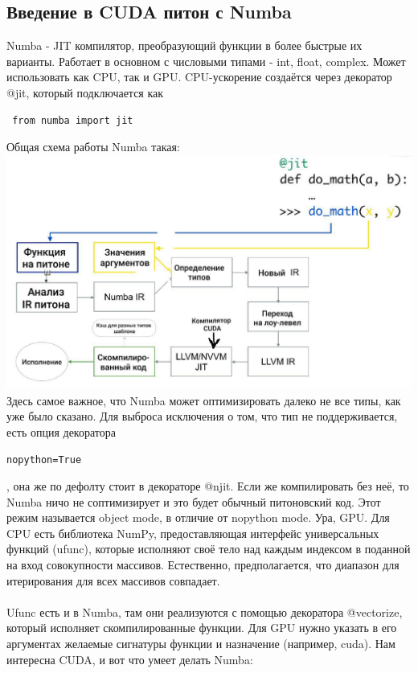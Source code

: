 \documentclass[14pt]{extarticle}
\begin{document}
\subsection{Введение в CUDA питон с Numba}
Numba - JIT компилятор, преобразующий функции в более быстрые 
их варианты. Работает в основном с числовыми типами - int, float,
complex. Может использовать как CPU, так и GPU.
CPU-ускорение создаётся через декоратор @jit, который 
подключается как \begin{verbatim} from numba import jit \end{verbatim} 
Общая схема работы Numba такая:\\
\includegraphics[scale=0.4]{numba.jpeg}
Здесь самое важное, что Numba может оптимизировать
далеко не все типы, как уже было сказано. Для выброса 
исключения о том, что тип не поддерживается, есть 
опция декоратора \begin{verbatim}nopython=True\end{verbatim},
она же по дефолту стоит в декораторе @njit. Если же
компилировать без неё, то Numba ничо не соптимизирует 
и это будет обычный питоновский код. Этот режим 
называется object mode, в отличие от nopython mode.
\newpage
Ура, GPU. Для CPU есть библиотека NumPy, 
предоставляющая интерфейс универсальных функций (ufunc), 
которые исполняют своё тело над каждым индексом в 
поданной на вход совокупности массивов. Естественно,
предполагается, что диапазон для 
итерирования для всех массивов совпадает.\\\\
Ufunc есть и в Numba, там они реализуются с помощью 
декоратора @vectorize, который исполняет
скомпилированные функции. Для GPU нужно указать в его 
аргументах желаемые сигнатуры функции и 
назначение (например, cuda). 
Нам интересна CUDA, и вот
что умеет делать Numba:\\
\end{document}
